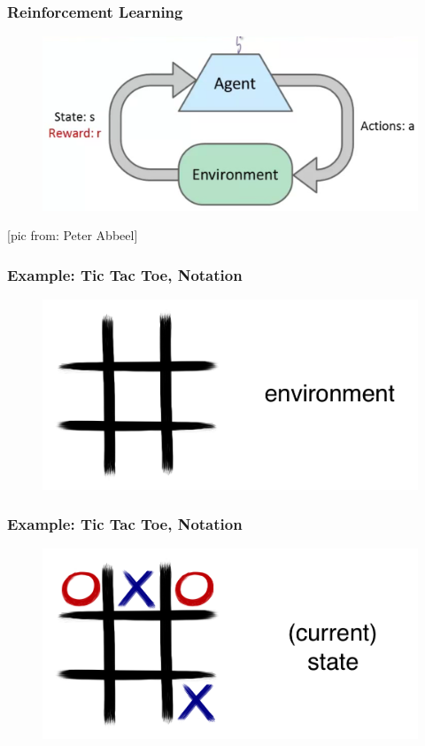 \documentclass[handout]{beamer}
\begin{document}
\begin{frame}\frametitle{Reinforcement Learning}\small
\vspace{8mm}

\begin{figure}
\includegraphics[width=0.85\linewidth]{Figures/rll3}
\end{figure}
\vspace{7mm}

\scriptsize [pic from: Peter Abbeel]
\end{frame}

\begin{frame}\frametitle{Example: Tic Tac Toe, Notation}\small
\vspace{4mm}
\begin{figure}
\includegraphics[width=0.75\linewidth]{Figures/tic1d}
\end{figure}
\vspace{5mm}
\end{frame}

\begin{frame}\frametitle{Example: Tic Tac Toe, Notation}\small
\vspace{4mm}

\begin{figure}
\includegraphics[width=0.75\linewidth]{Figures/tic1c}
\end{figure}
\vspace{5mm}
\end{frame}
\end{document}
